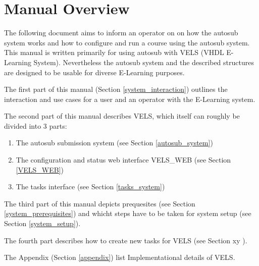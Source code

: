 \section{Manual Overview} \label{overview}

The following document aims to inform an operator on on how the autosub system works
and how to configure and run a course using the autosub system. This manual is written 
primarily for using autosub with VELS (VHDL E-Learning System). Nevertheless the autosub 
system and the described structures are designed to be usable for diverse E-Learning 
purposes.

The first part of this manual (Section \ref{system_interaction}) outlines the 
interaction and use cases for a user and an operator with the E-Learning system.

The second part of this manual describes VELS, which itself can roughly be divided 
into 3 parts:
\begin{enumerate}
    \item The autosub submission system (see Section \ref{autosub_system})
    \item The configuration and status web interface VELS\_WEB (see Section 
	      \ref{VELS_WEB})
    \item The tasks interface (see Section \ref{tasks_system})
\end{enumerate}

The third part of this manual depicts prequesites (see Section \ref{system_prerequisites})
and whicht steps have to be taken for system setup (see Section \ref{system_setup}).

The fourth part describes how to create new tasks for VELS (see Section xy ).

The Appendix (Section \ref{appendix}) list Implementational details of VELS.
